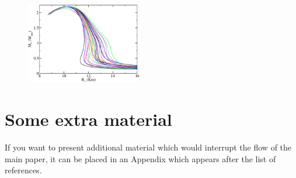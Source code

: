 \documentclass[fleqn,usenatbib]{mnras}
\begin{document}
\begin{figure}
\centering
\includegraphics[width=0.45\textwidth,angle=0]{TOVs.pdf}
\caption{}
\label{fig:TOVs}
\end{figure}























\appendix

\section{Some extra material}

If you want to present additional material which would interrupt the flow of the main paper,
it can be placed in an Appendix which appears after the list of references.



\bsp	%
\label{lastpage}
\end{document}
